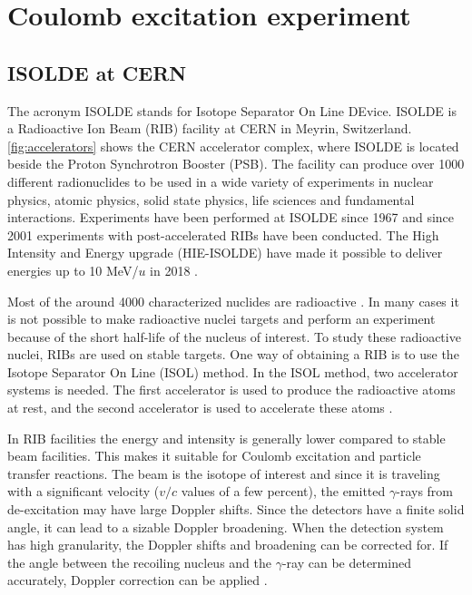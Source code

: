 \documentclass[twoside,english]{uiofysmaster/uiofysmaster}
\newcommand{\ga}{$\gamma$}
\begin{document}
\chapter{Coulomb excitation experiment}
\section{ISOLDE at CERN}
The acronym ISOLDE stands for Isotope Separator On Line DEvice. ISOLDE is a Radioactive Ion Beam (RIB) facility at CERN in Meyrin, Switzerland.  \autoref{fig:accelerators} shows the CERN accelerator complex, where ISOLDE is located beside the Proton Synchrotron Booster (PSB). The facility can produce over 1000 different radionuclides to be used in a wide variety of experiments in nuclear physics, atomic physics, solid state physics, life sciences and fundamental interactions. Experiments have been performed at ISOLDE since 1967 and since 2001 experiments with post-accelerated RIBs have been conducted. The High Intensity and Energy upgrade (HIE-ISOLDE) have made it possible to deliver energies up to 10 MeV/$u$ in 2018 \cite{HIE-ISOLDE, ISOLDE-web, ISOLDE-facility}. 

Most of the around 4000 characterized nuclides are radioactive  \cite{CoN}. In many cases it is not possible to make radioactive nuclei targets and perform an experiment because of the short half-life of the nucleus of interest. To study these radioactive nuclei, RIBs are used on stable targets. One way of obtaining a RIB is to use the Isotope Separator On Line (ISOL) method. In the ISOL method, two accelerator systems is needed. The first accelerator is used to produce the radioactive atoms at rest, and the second accelerator is used to accelerate these atoms \cite{ISOL}. 

In RIB facilities the energy and intensity is generally lower compared to stable beam facilities. This makes it suitable for Coulomb excitation and particle transfer reactions. The beam is the isotope of interest and since it is traveling with a significant velocity ($v/c$ values of a few percent), the emitted \ga-rays from de-excitation may have large Doppler shifts. Since the detectors have a finite solid angle, it can lead to a sizable Doppler broadening. When the detection system has high granularity, the Doppler shifts and broadening can be corrected for. If the angle between the recoiling nucleus and the \ga-ray can be determined accurately, Doppler correction can be applied \cite{MB-spect}.
\end{document}
